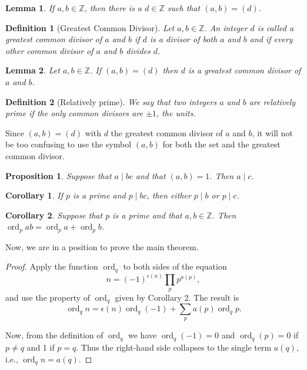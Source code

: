 \documentclass{article}
\newtheorem{corollary}{Corollary}
\newtheorem*{definition*}{Definition}
\newtheorem{lemma}{Lemma}
\newtheorem{proposition}{Proposition}
\numberwithin{proposition}{subsection}
\DeclareMathOperator{\ord}{ord}
\begin{document}
\begin{lemma}
  If $a, b \in \mathbb{Z}$, then there is a $d \in \mathbb{Z}$ such that
  $(a, b) = (d)$.
\end{lemma}

\begin{definition*}[Greatest Common Divisor]
  Let $a, b \in \mathbb{Z}$. An integer $d$ is called a \emph{greatest common
  divisor} of $a$ and $b$ if $d$ is a divisor of both $a$ and $b$ and if every
  other common divisor of $a$ and $b$ divides $d$.
\end{definition*}

\begin{lemma}
  Let $a, b \in \mathbb{Z}$. If $(a, b) = (d)$ then $d$ is a greatest common
  divisor of $a$ and $b$.
\end{lemma}

\begin{definition*}[Relatively prime]
  We say that two integers $a$ and $b$ are \emph{relatively prime} if the only
  common divisors are $\pm 1$, the units.
\end{definition*}
Since $(a, b) = (d)$ with $d$ the greatest common divisor of $a$ and $b$, it
will not be too confusing to use the symbol $(a, b)$ for both the set and the
greatest common divisor.

\begin{proposition}
  Suppose that $a \mid bc$ and that $(a, b) = 1$. Then $a \mid c$.
\end{proposition}

\begin{corollary}
  If $p$ is a prime and $p \mid bc$, then either $p \mid b$ or $p \mid c$.
\end{corollary}

\begin{corollary}
  Suppose that $p$ is a prime and that $a, b \in \mathbb{Z}$. Then $\ord_p ab =
  \ord_p a + \ord_p b$.
\end{corollary}

Now, we are in a position to prove the main theorem.

\begin{proof}
  Apply the function $\ord_q$ to both sides of the equation \[ n =
  (-1)^{\epsilon(n)} \prod_p p^{a(p)}, \] and use the property of $\ord_q$
  given by Corollary 2. The result is \[ \ord_q n = \epsilon(n)\ord_q(-1) +
  \sum_p a(p)\ord_q p. \]

  Now, from the definition of $\ord_q$ we have $\ord_q(-1) = 0$ and $\ord_q(p)
  = 0$ if $p \neq q$ and 1 if $p = q$. Thus the right-hand side collapses to
  the single term $a(q)$, i.e., $\ord_q n = a(q)$.
\end{proof}
\end{document}
